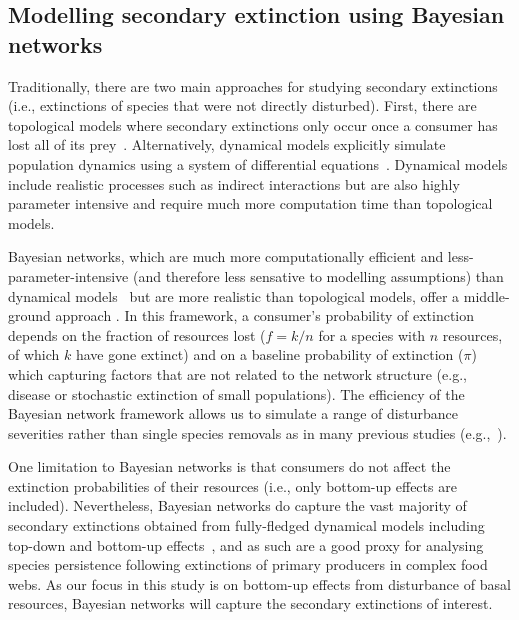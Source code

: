 \documentclass[12pt]{article}
\begin{document}
\begin{spacing}{1.0}
    
    \subsection*{Modelling secondary extinction using Bayesian networks}


        Traditionally, there are two main approaches for studying secondary extinctions (i.e., extinctions of species that were not directly disturbed). 
        First, there are topological models where secondary extinctions only occur once a consumer has lost all of its prey~\citep{dunne2009cascading}. 
        Alternatively, dynamical models explicitly simulate population dynamics using a system of differential equations~\citep{binzer2011susceptibility}. 
        Dynamical models include realistic processes such as indirect interactions but are also highly parameter intensive and require much more computation time than topological models. 
        
        
        Bayesian networks, which are much more computationally efficient and less-parameter-intensive (and therefore less sensative to modelling assumptions) than dynamical models~\citep{Eklof2013} but are more realistic than topological models, offer a middle-ground approach \citep{Eklof2013,Haussler2020}. 
        In this framework, a consumer's probability of extinction depends on the fraction of resources lost ($f = k/n$ for a species with $n$ resources, of which $k$ have gone extinct) and on a baseline probability of extinction ($\pi$) which capturing factors that are not related to the network structure (e.g., disease or stochastic extinction of small populations).
        The efficiency of the Bayesian network framework allows us to simulate a range of disturbance severities rather than single species removals as in many previous studies (e.g.,~\citealp[]{Memmott2004,Staniczenko2010,Cirtwill2022Oikos}).


        One limitation to Bayesian networks is that consumers do not affect the extinction probabilities of their resources (i.e., only bottom-up effects are included).
        Nevertheless, Bayesian networks do capture the vast majority of secondary extinctions obtained from fully-fledged dynamical models including top-down and bottom-up effects~\citep{Eklof2013}, and as such are a good proxy for analysing species persistence following extinctions of primary producers in complex food webs.
        As our focus in this study is on bottom-up effects from disturbance of basal resources, Bayesian networks will capture the secondary extinctions of interest.


\end{spacing}
\end{document}

